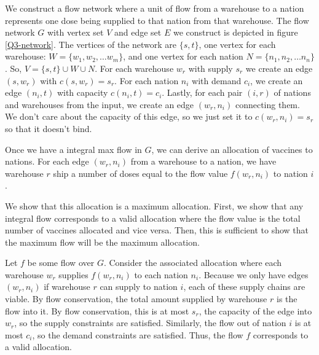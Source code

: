 \documentclass[11pt]{exam}
\begin{document}
We construct a flow network where a unit of flow from a warehouse to
a nation represents one dose being supplied to that nation from that
warehouse. The flow network $ G $ with vertex set $ V $ and edge set
$ E $ we construct is depicted in figure \ref{Q3-network}. The
vertices of the network are $ \{s, t\} $, one vertex for each
warehouse: $ W  = \{w_1, w_2, \ldots w_m \}$, and one vertex for each
nation $ N = \{n_1, n_2, \ldots n_n\} $. So, $ V = \{s, t\} \cup W
\cup N $. For each warehouse $ w_r $ with supply $ s_r $ we create an
edge $ (s, w_r) $ with $ c(s, w_r) = s_r $. For each nation $ n_i $
with demand $ c_i $, we create an edge $ (n_i, t) $ with capacity $
c(n_i, t) = c_i $. Lastly, for each pair $(i, r)$ of nations and
warehouses from the input, we create an edge $ (w_r, n_i) $ connecting
them. We don't care about the capacity of this edge, so we just set
it to $ c(w_r, n_i) = s_r $ so that it doesn't bind.

Once we have a integral max flow in $ G $, we can derive an
allocation of vaccines to nations. For each edge $ (w_r, n_i) $ from
a warehouse to a nation, we have warehouse $ r $ ship a number of
doses equal to the flow value $ f(w_r, n_i) $ to nation $ i $.

We show that this allocation is a maximum allocation. First, we show
that any integral flow corresponds to a valid allocation where the
flow value is the total number of vaccines allocated and vice versa.
Then, this is sufficient to show that the maximum flow will be the
maximum allocation.

Let $ f $ be some flow over $ G $. Consider the associated allocation
where each warehouse $ w_r $ supplies $ f(w_r, n_i) $ to each nation
$ n_i $. Because we only have edges $ (w_r, n_i) $ if warehouse $ r $
can supply to nation $ i $, each of these supply chains are viable.
By flow conservation, the total amount supplied by warehouse $ r $ is
the flow into it. By flow conservation, this is at most $ s_r $, the
capacity of the edge into $ w_r $, so the supply constraints are
satisfied. Similarly, the flow out of nation $ i $ is at most $ c_i
$, so the demand constraints are satisfied. Thus, the flow $ f $
corresponds to a valid allocation.
\end{document}

